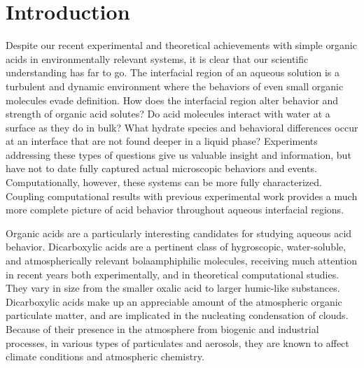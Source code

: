 \section {Introduction}

Despite our recent experimental and theoretical achievements with simple organic acids in environmentally relevant systems, it is clear that our scientific understanding has far to go. The interfacial region of an aqueous solution is a turbulent and dynamic environment where the behaviors of even small organic molecules evade definition. How does the interfacial region alter behavior and strength of organic acid solutes? Do acid molecules interact with water at a surface as they do in bulk? What hydrate species and behavioral differences occur at an interface that are not found deeper in a liquid phase? Experiments addressing these types of questions give us valuable insight and information, but have not to date fully captured actual microscopic behaviors and events. Computationally, however, these systems can be more fully characterized. Coupling computational results with previous experimental work provides a much more complete picture of acid behavior throughout aqueous interfacial regions.

Organic acids are a particularly interesting candidates for studying aqueous acid behavior. Dicarboxylic acids are a pertinent class of hygroscopic, water-soluble, and atmospherically relevant bolaamphiphilic molecules, receiving much attention in recent years both experimentally,\cite{Peng2001,Kawamura1993,Kawamura1996,Kawamura1996a,Kawamura1999,Senpere1994,Senpere1996,Aggarwal2008,Hsieh2007,Hsieh2009,Pavuluri2010,Nieminen1992,Nahalovsk1970,Dam1983,Mahiuddin2008,Odum1996,Odum1997,Pandis1991,Zhang1992,Hoffmann1997,Hori2003,Bilde2003,Nilsson1998} and in theoretical computational studies.\cite{Darvas2010,Darvas2011,Dlugosz2004,Mohajeri2004,Krijn1988,Chen2000,Nieminen1992,Mahiuddin2008,Ma2011,Nilsson1998} They vary in size from the smaller oxalic acid to larger humic-like substances.\cite{Chebbi1996,Badger2005} Dicarboxylic acids make up an appreciable amount of the atmospheric organic particulate matter, and are implicated in the nucleating condensation of clouds.\cite{Darvas2010,Darvas2011,Cruz1997,Zobrist2006,Hori2003,Shantz2003} Because of their presence in the atmosphere from biogenic and industrial processes, in various types of particulates and aerosols, they are known to affect climate conditions and atmospheric chemistry.\cite{Kanakidou2005,Finlayson-Pitts2000,Seinfeld1998,Darvas2010,Darvas2011,Zobrist2006,Yan2008,Odum1996,Odum1997,Pandis1991,Zhang1992,Hoffmann1997,Hori2003,Kawamura1996a,Bilde2003,Shantz2003} 


